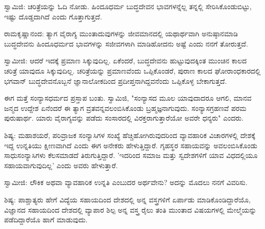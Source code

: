 ಸ್ವಾಮಿಜಿ: ಚರಿತ್ರೆಯನ್ನು ಓದಿ ನೋಡು. ಹಿಂದೂಧರ್ಮ ಬುದ್ಧದೇವನ ಭಾವಗಳನ್ನೆಲ್ಲ ತನ್ನಲ್ಲಿ ಸೇರಿಸಿಕೊಂಡುಬಿಟ್ಟು, ಇಷ್ಟು ದೊಡ್ಡದಾಗಿದೆ ಎಂದು ಗೊತ್ತಾಗುತ್ತದೆ.

ರಾಮಕೃಷ್ಣಾನಂದ: ತ್ಯಾಗ ವೈರಾಗ್ಯ ಮುಂತಾದುವುಗಳನ್ನು ಜೀವಮಾನದಲ್ಲಿ ಯಥಾರ್ಥವಾಗಿ ಅನುಷ್ಠಾನಮಾಡಿ ಬುದ್ಧದೇವನು ಹಿಂದೂಧರ್ಮದ ಭಾವಗಳನ್ನು ಸಜೀವಗಳಾಗಿ ಮಾಡಿಹೋದನು ಅಷ್ಟೆ ಎಂದು ನನಗೆ ತೋರುತ್ತದೆ.

ಸ್ವಾಮೀಜಿ: ಆದರೆ ಇದಕ್ಕೆ ಪ್ರಮಾಣ ಸಿಕ್ಕುವುದಿಲ್ಲ. ಏಕೆಂದರೆ, ಬುದ್ಧದೇವನು ಹುಟ್ಟುವುದಕ್ಕಿಂತ ಮುಂಚಿನ ಕಾಲದ ಚರಿತ್ರೆ ಯಾವುದೂ ಸಿಕ್ಕುವುದಿಲ್ಲ. ಚರಿತ್ರೆಯನ್ನು ಪ್ರಮಾಣವೆಂದು ಒಪ್ಪಿಕೊಂಡರೆ, ಪುರಾಣ ಕಾಲದ ಘೋರಾಂಧಕಾರದಲ್ಲಿ ಭಗವಾನ್ ಬುದ್ಧದೇವನೊಬ್ಬನೆ ಜ್ಞಾನಾಲೋಕದಿಂದ ಪ್ರದೀಪ್ತನಾಗಿದ್ದವನೆಂದು ಒಪ್ಪಿಕೊಳ್ಳ ಬೇಕಾಗುತ್ತದೆ.

ಈಗ ಮತ್ತೆ ಸಂನ್ಯಾಸಧರ್ಮದ ಪ್ರಸ್ತಾಪ ಬಂತು. ಸ್ವಾಮಿಜಿ, "ಸಂನ್ಯಾಸದ ಮೂಲ ಯಾವುದಾದರೂ ಆಗಲಿ, ಮಾನವ ಜನ್ಮದ ಉದ್ದೇಶ ಏನೆಂದರೆ ಈ ತ್ಯಾಗ ವ್ರತವನ್ನವಲಂಬಿಸಿಕೊಂಡು ಬ್ರಹ್ಮಜ್ಞನಾಗುವುದು. ಸಂನ್ಯಾಸಗ್ರಹಣವೆ ಪರಮ ಪುರುಷಾರ್ಥ. ಯಾರು ವೈರಾಗ್ಯವನ್ನು ಪಡೆದು ಸಂಸಾರದಲ್ಲಿ ವಿರಕ್ತರಾಗುತ್ತಾರೆಯೋ ಅವರೇ ಧನ್ಯರು" ಎಂದರು.

ಶಿಷ್ಯ: ಮಹಾಶಯರೆ, ಪರಿವ್ರಾಜಕ ಸಂನ್ಯಾಸಿಗಳ ಸಂಖ್ಯೆ ಹೆಚ್ಚಿಹೋಗಿರುವುದರಿಂದ ವ್ಯಾವಹಾರಿಕ ವಿಚಾರಗಳಲ್ಲಿ ದೇಶಕ್ಕೆ ಇದ್ದ ಉನ್ನತಿಯು ಕ್ಷೀಣವಾಗಿದೆ ಎಂದು ಈಗ ಅನೇಕರು ಹೇಳುತ್ತಿದ್ದಾರೆ. ಗೃಹಸ್ಥರ ಸಹಾಯವನ್ನು ಅವಲಂಬಿಸಿಕೊಂಡು ಸಾಧುಸಂನ್ಯಾಸಿಗಳು ಕೆಲಸಮಾಡದೆ ತಿರುಗುತ್ತಿದ್ದಾರೆ. 'ಇದರಿಂದ ಸಮಾಜ ಮತ್ತು ಸ್ವದೇಶಗಳಿಗೆ ಯಾವ ವಿಧದಲ್ಲಿಯೂ ಸಹಾಯವಾಗುವುದಿಲ್ಲ' ಎಂದು ಅವರು ಹೇಳುತ್ತಾರೆ.

ಸ್ವಾಮೀಜಿ: ಲೌಕಿಕ ಅಥವಾ ವ್ಯಾವಹಾರಿಕ ಉನ್ನತಿ ಎಂಬುದರ ಅರ್ಥವೇನು? ಅದನ್ನು ಮೊದಲು ನನಗೆ ವಿವರಿಸು.

ಶಿಷ್ಯ: ಪಾಶ್ಚಾತ್ಯರು ಹೇಗೆ ವಿದ್ಯೆಯ ಸಹಾಯದಿಂದ ದೇಶದಲ್ಲಿ ಅನ್ನ ವಸ್ತ್ರಗಳಿಗೆ ಏರ್ಪಾಡು ಮಾಡಿಕೊಂಡಿದ್ದಾರೆಯೊ, ವಿಜ್ಞಾನದ ಸಹಾಯದಿಂದ ದೇಶದಲ್ಲಿ ವ್ಯಾಪಾರ ಶಿಲ್ಪ ಅನ್ನ ವಸ್ತ್ರ ರೈಲು ತಂತಿ ಮುಂತಾದ ವಿಷಯಗಳಲ್ಲಿ ಮೇಲ್ಮೆಯನ್ನು ಪಡೆದಿದ್ದಾರೆಯೊ ಹಾಗೆ ಮಾಡುವುದು.

